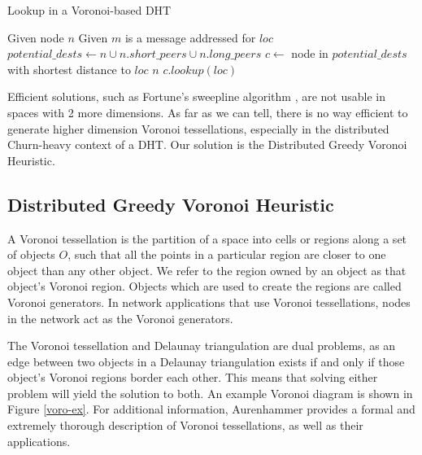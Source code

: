 \begin{algorithm}
	\caption{Lookup in a Voronoi-based DHT}
	\label{alg:lookup}
	\begin{algorithmic}[1] 
		\State Given node $n$
		\State Given $m$ is a message addressed for $loc$
		\State $potential\_dests \leftarrow n \cup n.short\_peers \cup n.long\_peers$
		\State $c \leftarrow $ node in $ potential\_dests$ with shortest distance to $loc$
			\State \Return $n$
		\Else 
			\State \Return $c.lookup(loc)$
		\EndIf
	\end{algorithmic}
\end{algorithm}


Efficient solutions, such as Fortune's sweepline algorithm \cite{fortune1987sweepline}, are not usable in spaces with 2 more dimensions.
As far as we can tell, there is no way efficient to generate higher dimension Voronoi tessellations, especially in the distributed Churn-heavy context of a DHT.
Our solution is the Distributed Greedy Voronoi Heuristic.

\subsection*{Distributed Greedy Voronoi Heuristic}
A Voronoi tessellation is the partition of a space into cells or regions along a set of objects $O$, such that all the points in a particular region are closer to one object than any other object.  
We refer to the region owned by an object as that object's Voronoi region.
Objects which are used to create the regions are called Voronoi generators.
In network applications that use Voronoi tessellations, nodes in the network act as the Voronoi generators.

The Voronoi tessellation and Delaunay triangulation are dual problems, as an edge between two objects in a Delaunay triangulation exists if and only if those object's Voronoi regions border each other.  
This means that solving either problem will yield the solution to both.   
An example Voronoi diagram is shown in Figure \ref{voro-ex}.
For additional information, Aurenhammer \cite{voronoi} provides a formal and extremely thorough description of Voronoi tessellations, as well as their applications.


